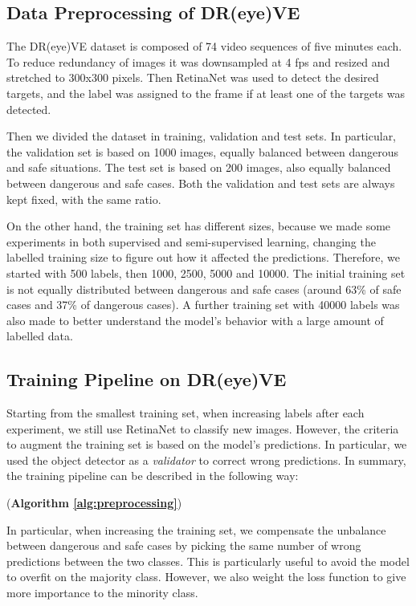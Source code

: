 \subsection{Data Preprocessing of DR(eye)VE}
The DR(eye)VE dataset is composed of 74 video sequences of five minutes each.
To reduce redundancy of images it was downsampled at 4 fps and resized and 
stretched to 300x300 pixels. Then RetinaNet \cite{retinanet} was used to detect 
the desired targets, 
and the label was assigned to the frame if at least one of the targets was detected.

Then we divided the dataset in training, validation and test sets. In particular,
the validation set is based on 1000 images, 
equally balanced between dangerous and safe situations.
The test set is based on 200 images, also equally balanced between dangerous 
and safe cases.
Both the validation and test sets are always kept fixed, with the same ratio.

On the other hand, the training set has different sizes, because we made some 
experiments in both supervised and semi-supervised learning, changing the 
labelled training size to figure out how it affected the predictions.
Therefore, we started with 500 labels, then 1000, 2500, 5000 and 10000.
The initial training set is not equally distributed between dangerous and safe 
cases (around 63\% of safe cases and 37\% of dangerous cases).
A further training set with 40000 labels was also made to better understand the 
model's behavior with a large amount of labelled data.

\subsection{Training Pipeline on DR(eye)VE}
Starting from the smallest training set, when increasing labels after each 
experiment, we still use RetinaNet to classify new images. However, the criteria 
to augment the training set is based on the model's predictions. In particular, 
we used the object detector as a \emph{validator} to correct wrong predictions.
In summary, the training pipeline can be described in the following way:
%
\begin{algorithm}
    \vspace{0.2cm}
    \DontPrintSemicolon
     (\textbf{Algorithm \ref{alg:preprocessing}})\;
\end{algorithm}
In particular, when increasing the training set, we compensate the unbalance 
between dangerous and safe cases by picking the same number of wrong predictions 
between the two classes. This is particularly useful to avoid the model to 
overfit on the majority class.
However, we also weight the loss function to give more importance to the 
minority class.

